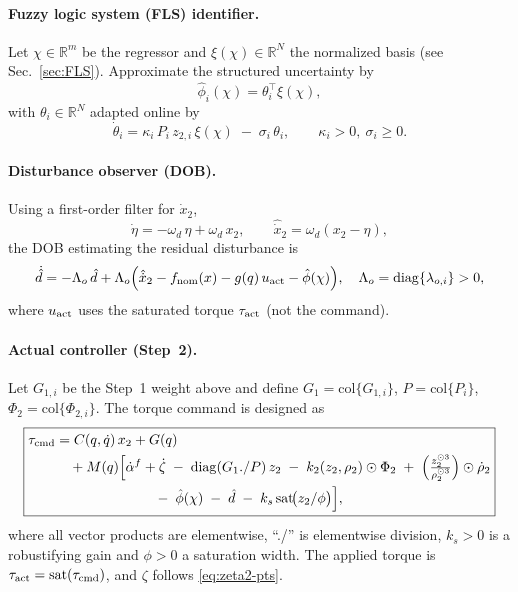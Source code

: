 \documentclass[pdflatex,sn-mathphys-num]{sn-jnl}%
\theoremstyle{thmstyleone}%
\theoremstyle{thmstyletwo}%
\theoremstyle{thmstylethree}%
\begin{document}
\paragraph{Fuzzy logic system (FLS) identifier.}
Let $\chi\in\mathbb{R}^m$ be the regressor and $\xi(\chi)\in\mathbb{R}^{N}$ the normalized basis
(see Sec.~\ref{sec:FLS}).
Approximate the structured uncertainty by
\[
\hat\phi_i(\chi)=\theta_i^\top \xi(\chi),
\]
with $\theta_i\in\mathbb{R}^{N}$ adapted online by
\begin{equation}\label{eq:theta-law}
\dot\theta_i = \kappa_i\,P_i\,z_{2,i}\,\xi(\chi) \;-\; \sigma_i\,\theta_i,\qquad
\kappa_i>0,\ \sigma_i\ge 0 .
\end{equation}

\paragraph{Disturbance observer (DOB).}
Using a first-order filter for $\dot x_2$,
\[
\dot\eta=-\omega_d\,\eta+\omega_d\,x_2,\qquad \hat{\dot x}_2=\omega_d(x_2-\eta),
\]
the DOB estimating the residual disturbance is
\begin{equation}\label{eq:dob}
\dot{\hat d}= -\Lambda_o\,\hat d
+\Lambda_o\Big(\hat{\dot x}_2 - f_{\rm nom}(x) - g(q)\,u_{\rm act} - \hat\phi(\chi)\Big),
\quad \Lambda_o=\mathrm{diag}\{\lambda_{o,i}\}>0,
\end{equation}
where $u_{\rm act}$ uses the saturated torque $\tau_{\rm act}$ (not the command).

\paragraph{Actual controller (Step~2).}
Let $G_{1,i}$ be the Step~1 weight above and define $G_1=\mathrm{col}\{G_{1,i}\}$,
$P=\mathrm{col}\{P_i\}$,
$\Phi_2=\mathrm{col}\{\Phi_{2,i}\}$.
The torque command is designed as
\begin{equation}\label{eq:tau-cmd}
\boxed{
\begin{aligned}
\tau_{\rm cmd} &= C(q,\dot q)\,x_2 + G(q) \\
&\quad + M(q)\Big[
\dot\alpha^{f}+\dot\zeta
\;-\;\mathrm{diag}(G_1./P)\,z_{2}
\;-\;k_{2}(z_{2},\rho_{2})\odot \Phi_{2}
\;+\;\Big(\tfrac{z_{2}^{\odot 3}}{\rho_{2}^{\odot 3}}\Big)\odot \dot\rho_{2} \\
&\hspace{24mm}
\;-\;\hat\phi(\chi)
\;-\;\hat d
\;-\;k_s\,\mathrm{sat}\!\big(z_{2}/\phi\big)
\Big],
\end{aligned}}
\end{equation}
where all vector products are elementwise, ``./'' is elementwise division,
$k_s>0$ is a robustifying gain and $\phi>0$ a saturation width. The applied torque is
$\tau_{\rm act}=\mathrm{sat}(\tau_{\rm cmd})$, and $\zeta$ follows \eqref{eq:zeta2-pts}.
\end{document}
